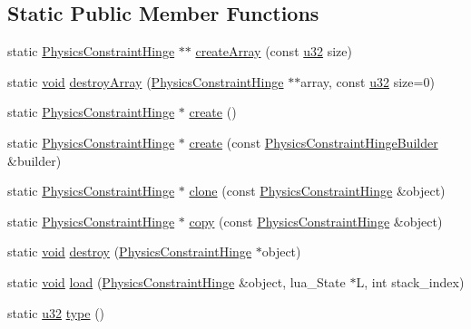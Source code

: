 \subsection*{Static Public Member Functions}
\begin{DoxyCompactItemize}
\item 
static \mbox{\hyperlink{classnjli_1_1_physics_constraint_hinge}{Physics\+Constraint\+Hinge}} $\ast$$\ast$ \mbox{\hyperlink{classnjli_1_1_physics_constraint_hinge_a26086ec7b819cb9f77875926367e65bf}{create\+Array}} (const \mbox{\hyperlink{_util_8h_a10e94b422ef0c20dcdec20d31a1f5049}{u32}} size)
\item 
static \mbox{\hyperlink{_thread_8h_af1e856da2e658414cb2456cb6f7ebc66}{void}} \mbox{\hyperlink{classnjli_1_1_physics_constraint_hinge_a9f5b9ab458ef6a2551a7ede20b3c2d3d}{destroy\+Array}} (\mbox{\hyperlink{classnjli_1_1_physics_constraint_hinge}{Physics\+Constraint\+Hinge}} $\ast$$\ast$array, const \mbox{\hyperlink{_util_8h_a10e94b422ef0c20dcdec20d31a1f5049}{u32}} size=0)
\item 
static \mbox{\hyperlink{classnjli_1_1_physics_constraint_hinge}{Physics\+Constraint\+Hinge}} $\ast$ \mbox{\hyperlink{classnjli_1_1_physics_constraint_hinge_a143ffa4a346d08ecba967b4e0bd8b43c}{create}} ()
\item 
static \mbox{\hyperlink{classnjli_1_1_physics_constraint_hinge}{Physics\+Constraint\+Hinge}} $\ast$ \mbox{\hyperlink{classnjli_1_1_physics_constraint_hinge_ab30405bdc3c9a7bd84915ada5c07fd27}{create}} (const \mbox{\hyperlink{classnjli_1_1_physics_constraint_hinge_builder}{Physics\+Constraint\+Hinge\+Builder}} \&builder)
\item 
static \mbox{\hyperlink{classnjli_1_1_physics_constraint_hinge}{Physics\+Constraint\+Hinge}} $\ast$ \mbox{\hyperlink{classnjli_1_1_physics_constraint_hinge_a633ccb73ed4e5522fc71e55759bb31e0}{clone}} (const \mbox{\hyperlink{classnjli_1_1_physics_constraint_hinge}{Physics\+Constraint\+Hinge}} \&object)
\item 
static \mbox{\hyperlink{classnjli_1_1_physics_constraint_hinge}{Physics\+Constraint\+Hinge}} $\ast$ \mbox{\hyperlink{classnjli_1_1_physics_constraint_hinge_a202f0ee9f280a7c0e691239c9b373c19}{copy}} (const \mbox{\hyperlink{classnjli_1_1_physics_constraint_hinge}{Physics\+Constraint\+Hinge}} \&object)
\item 
static \mbox{\hyperlink{_thread_8h_af1e856da2e658414cb2456cb6f7ebc66}{void}} \mbox{\hyperlink{classnjli_1_1_physics_constraint_hinge_adb8534e0d1b950006347ed71ae652d87}{destroy}} (\mbox{\hyperlink{classnjli_1_1_physics_constraint_hinge}{Physics\+Constraint\+Hinge}} $\ast$object)
\item 
static \mbox{\hyperlink{_thread_8h_af1e856da2e658414cb2456cb6f7ebc66}{void}} \mbox{\hyperlink{classnjli_1_1_physics_constraint_hinge_a6e29f3b72d9e4f1215f8170dadbf6236}{load}} (\mbox{\hyperlink{classnjli_1_1_physics_constraint_hinge}{Physics\+Constraint\+Hinge}} \&object, lua\+\_\+\+State $\ast$L, int stack\+\_\+index)
\item 
static \mbox{\hyperlink{_util_8h_a10e94b422ef0c20dcdec20d31a1f5049}{u32}} \mbox{\hyperlink{classnjli_1_1_physics_constraint_hinge_a567c2dc54151dbcffb8e26590bc6bfb5}{type}} ()
\end{DoxyCompactItemize}
